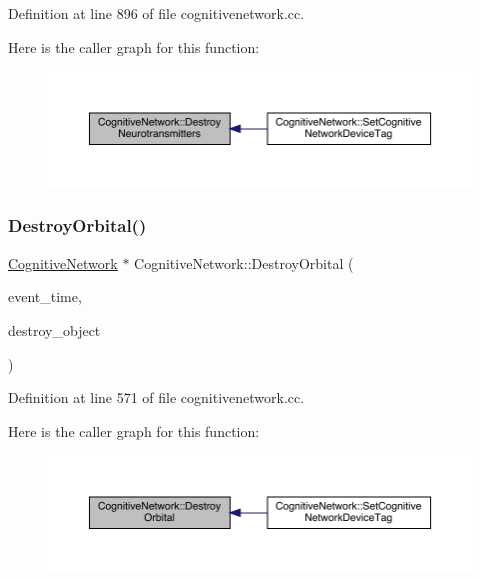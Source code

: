 Definition at line 896 of file cognitivenetwork.\+cc.

Here is the caller graph for this function\+:
\nopagebreak
\begin{figure}[H]
\begin{center}
\leavevmode
\includegraphics[width=350pt]{class_cognitive_network_a7f705e562562e9778ee0b5260dda9f09_icgraph}
\end{center}
\end{figure}
\mbox{\label{class_cognitive_network_aefecb3a2464f7f21449e522af5119c63}} 
\subsubsection{\texorpdfstring{Destroy\+Orbital()}{DestroyOrbital()}}
{\footnotesize\ttfamily \hyperlink{class_cognitive_network}{Cognitive\+Network} $\ast$ Cognitive\+Network\+::\+Destroy\+Orbital (\begin{DoxyParamCaption}\item[{std\+::chrono\+::time\+\_\+point$<$ \hyperlink{universe_8h_a0ef8d951d1ca5ab3cfaf7ab4c7a6fd80}{Clock} $>$}]{event\+\_\+time,  }\item[{\hyperlink{class_cognitive_network}{Cognitive\+Network} $\ast$}]{destroy\+\_\+object }\end{DoxyParamCaption})}



Definition at line 571 of file cognitivenetwork.\+cc.

Here is the caller graph for this function\+:
\nopagebreak
\begin{figure}[H]
\begin{center}
\leavevmode
\includegraphics[width=350pt]{class_cognitive_network_aefecb3a2464f7f21449e522af5119c63_icgraph}
\end{center}
\end{figure}
\mbox{\label{class_cognitive_network_a0ee8259d26e30779bf06471fb8a10bb5}} 
